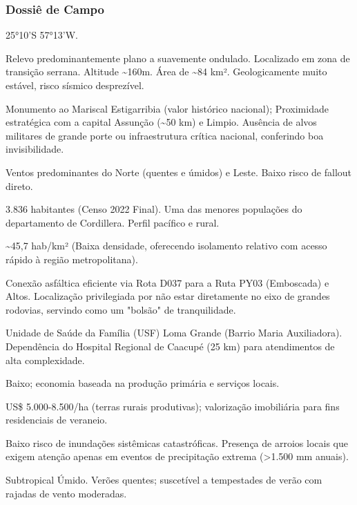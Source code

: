 \subsubsection{Dossiê de Campo}
\begin{description}[style=nextline,leftmargin=0.5cm,font=\bfseries]
\item[Coordenadas]  25°10'S 57°13'W.
\item[Topografia]  Relevo predominantemente plano a suavemente ondulado. Localizado em zona de transição serrana. Altitude \textasciitilde 160m. Área de \textasciitilde 84 km². Geologicamente muito estável, risco sísmico desprezível.
\item[Alvos Estratégicos]  Monumento ao Mariscal Estigarribia (valor histórico nacional); Proximidade estratégica com a capital Assunção (\textasciitilde 50 km) e Limpio. Ausência de alvos militares de grande porte ou infraestrutura crítica nacional, conferindo boa invisibilidade.
\item[Fallout]  Ventos predominantes do Norte (quentes e úmidos) e Leste. Baixo risco de fallout direto.
\item[População]  3.836 habitantes (Censo 2022 Final). Uma das menores populações do departamento de Cordillera. Perfil pacífico e rural.
\item[Densidade]  \textasciitilde 45,7 hab/\allowbreak km² (Baixa densidade, oferecendo isolamento relativo com acesso rápido à região metropolitana).
\item[Vias de Acesso]  Conexão asfáltica eficiente via Rota D037 para a Ruta PY03 (Emboscada) e Altos. Localização privilegiada por não estar diretamente no eixo de grandes rodovias, servindo como um "bolsão" de tranquilidade.
\item[Serviços]  Unidade de Saúde da Família (USF) Loma Grande (Barrio Maria Auxiliadora). Dependência do Hospital Regional de Caacupé (25 km) para atendimentos de alta complexidade.
\item[Custo de Vida]  Baixo; economia baseada na produção primária e serviços locais.
\item[Preço da Terra]  US\$ 5.000-8.500/\allowbreak ha (terras rurais produtivas); valorização imobiliária para fins residenciais de veraneio.
\item[Hidrologia]  Baixo risco de inundações sistêmicas catastróficas. Presença de arroios locais que exigem atenção apenas em eventos de precipitação extrema (>1.500 mm anuais).
\item[Clima]  Subtropical Úmido. Verões quentes; suscetível a tempestades de verão com rajadas de vento moderadas.

\end{description}
